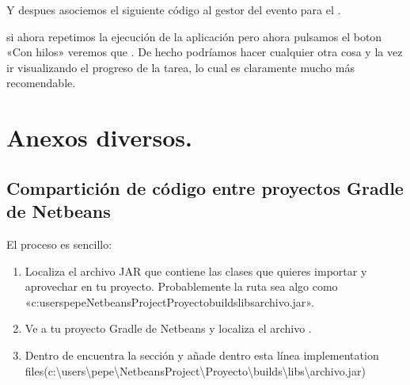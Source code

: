 \documentclass[letterpaper,10pt,spanish]{sphinxmanual}
\begin{document}
Y despues asociemos el siguiente código al gestor del evento  para el .

\begin{sphinxVerbatim}[commandchars=\\\{\}]
    
        
\end{sphinxVerbatim}

si ahora repetimos la ejecución de la aplicación pero ahora pulsamos el boton «Con hilos» veremos que  . De hecho podríamos hacer cualquier otra cosa y la vez ir visualizando el progreso de la tarea, lo cual es claramente mucho más recomendable.


\chapter{Anexos diversos.}
\label{\detokenize{textos/anexos:anexos-diversos}}\label{\detokenize{textos/anexos::doc}}

\section{Compartición de código entre proyectos Gradle de Netbeans}
\label{\detokenize{textos/anexos:comparticion-de-codigo-entre-proyectos-gradle-de-netbeans}}
El proceso es sencillo:
\begin{enumerate}
%
\item {} 
Localiza el archivo JAR que contiene las clases que quieres importar y aprovechar en tu proyecto. Probablemente la ruta sea algo como «c:userspepeNetbeansProjectProyectobuildslibsarchivo.jar».

\item {} 
Ve a tu proyecto Gradle de Netbeans y localiza el archivo .

\item {} 
Dentro de  encuentra la sección  y añade dentro esta línea {\color{red}\bfseries{}\textasciigrave{}\textasciigrave{}}implementation files(c:\textbackslash{}users\textbackslash{}pepe\textbackslash{}NetbeansProject\textbackslash{}Proyecto\textbackslash{}builds\textbackslash{}libs\textbackslash{}archivo.jar)

\end{enumerate}
\end{document}
